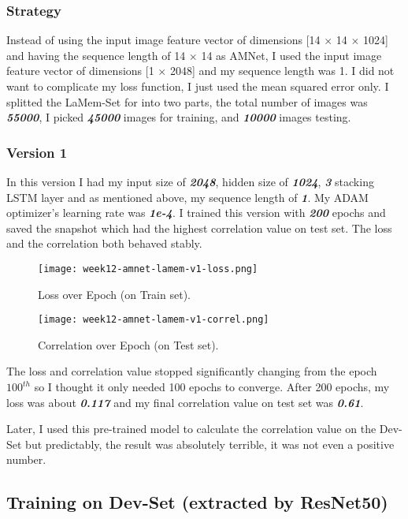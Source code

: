 \subsubsection{Strategy}
Instead of using the input image feature vector of dimensions [14 $\times$ 14 $\times$ 1024] and having the sequence length of 14 $\times$ 14 as AMNet, I used the input image feature vector of dimensions [1 $\times$ 2048] and my sequence length was 1. I did not want to complicate my loss function, I just used the mean squared error only. I splitted the LaMem-Set for into two parts, the total number of images was \textbf{\emph{55000}}, I picked \textbf{\emph{45000}} images for training, and \textbf{\emph{10000}} images testing.

\subsubsection{Version 1}
In this version I had my input size of \textbf{\emph{2048}}, hidden size of \textbf{\emph{1024}}, \textbf{\emph{3}} stacking LSTM layer and as mentioned above, my sequence length of \textbf{\emph{1}}. My ADAM optimizer's learning rate was \textbf{\emph{1e-4}}. I trained this version with \textbf{\emph{200}} epochs and saved the snapshot which had the highest correlation value on test set. The loss and the correlation both behaved stably.

\begin{figure}[!ht]
\centering
\texttt{[image: week12-amnet-lamem-v1-loss.png]}
\caption{Loss over Epoch (on Train set).}
\end{figure}

\begin{figure}[!ht]
\centering
\texttt{[image: week12-amnet-lamem-v1-correl.png]}
\caption{Correlation over Epoch (on Test set).}
\end{figure}

The loss and correlation value stopped significantly changing from the epoch $100^{th}$ so I thought it only needed 100 epochs to converge. After 200 epochs, my loss was about \textbf{\emph{0.117}} and my final correlation value on test set was \textbf{\emph{0.61}}.

Later, I used this pre-trained model to calculate the correlation value on the Dev-Set but predictably, the result was absolutely terrible, it was not even a positive number.

\subsection{Training on Dev-Set (extracted by ResNet50)}
